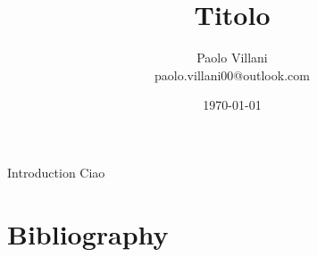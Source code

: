 \documentclass[10pt, a4paper, twoside]{article}
\begin{document}
\title{Titolo}
\author{Paolo Villani\\paolo.villani00@outlook.com}
\date{\today}
\maketitle
\begin{abstractBox}[colbacktitle=black]{Introduction}{
Ciao
}
\end{abstractBox}

\vspace{.5cm}
\pagestyle{fancy}
\pagestyle{fancyfront}

\pagestyle{fancymain}
\tableofcontents

\newpage

\newpage

\newpage

\newpage

\newpage

\newpage




\newpage
\pagestyle{fancyapp}
\appendix


\newpage
\pagestyle{fancybib}
\section*{Bibliography}

\renewcommand\refname{}


\end{document}
